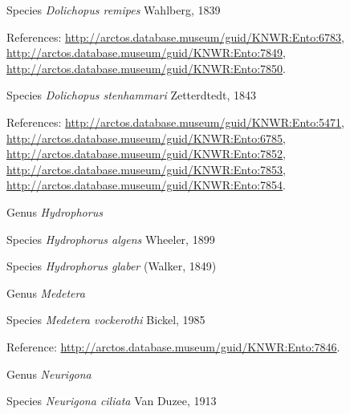 \documentclass[9pt, article]{memoir}
\begin{document}
\begin{multicols}{2}
\vspace{6pt}\noindent\hspace{36pt}Species \textit{Dolichopus remipes} Wahlberg, 1839


\vspace{6pt}References: 
\url{http://arctos.database.museum/guid/KNWR:Ento:6783}, 
\url{http://arctos.database.museum/guid/KNWR:Ento:7849}, 
\url{http://arctos.database.museum/guid/KNWR:Ento:7850}.

\vspace{6pt}\noindent\hspace{36pt}Species \textit{Dolichopus stenhammari} Zetterdtedt, 1843


\vspace{6pt}References: 
\url{http://arctos.database.museum/guid/KNWR:Ento:5471}, 
\url{http://arctos.database.museum/guid/KNWR:Ento:6785}, 
\url{http://arctos.database.museum/guid/KNWR:Ento:7852}, 
\url{http://arctos.database.museum/guid/KNWR:Ento:7853}, 
\url{http://arctos.database.museum/guid/KNWR:Ento:7854}.

\vspace{6pt}\noindent\hspace{30pt}Genus \textit{Hydrophorus}


\vspace{6pt}\noindent\hspace{36pt}Species \textit{Hydrophorus algens} Wheeler, 1899


\vspace{6pt}\noindent\hspace{36pt}Species \textit{Hydrophorus glaber} (Walker, 1849)


\vspace{6pt}\noindent\hspace{30pt}Genus \textit{Medetera}


\vspace{6pt}\noindent\hspace{36pt}Species \textit{Medetera vockerothi} Bickel, 1985


\vspace{6pt}Reference: 
\url{http://arctos.database.museum/guid/KNWR:Ento:7846}.

\vspace{6pt}\noindent\hspace{30pt}Genus \textit{Neurigona}


\vspace{6pt}\noindent\hspace{36pt}Species \textit{Neurigona ciliata} Van Duzee, 1913



\end{multicols}
\end{document}
